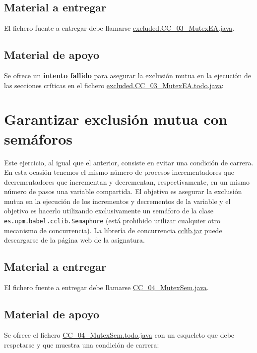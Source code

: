 \documentclass{article}
\begin{document}
\subsection*{Material a entregar}
El fichero fuente a entregar debe llamarse \url{excluded.CC_03_MutexEA.java}.

\subsection*{Material de apoyo}
Se ofrece un \textbf{intento
fallido} para asegurar la exclusión mutua en la ejecución de las
secciones críticas en el fichero \url{excluded.CC_03_MutexEA.todo.java}:


\clearpage
\section{Garantizar exclusión mutua con semáforos}
Este ejercicio, al igual que el anterior, consiste en evitar una
condición de carrera. En esta ocasión tenemos el mismo número de
procesos incrementadores que decrementadores que incrementan y
decrementan, respectivamente, en un mismo número de pasos una variable
compartida. El objetivo es asegurar la exclusión mutua en la ejecución
de los incrementos y decrementos de la variable y el objetivo es
hacerlo utilizando exclusivamente un semáforo de la clase
\lstinline{es.upm.babel.cclib.Semaphore} (está prohibido utilizar cualquier otro
mecanismo de concurrencia). La librería de concurrencia \url{cclib.jar}
puede descargarse de la página web de la asignatura.

\subsection*{Material a entregar}
El fichero fuente a entregar debe llamarse \url{CC_04_MutexSem.java}.

\subsection*{Material de apoyo}
Se ofrece el fichero \url{CC_04_MutexSem.todo.java} con un esqueleto
que debe respetarse y que muestra una condición de carrera:


\clearpage
\end{document}
